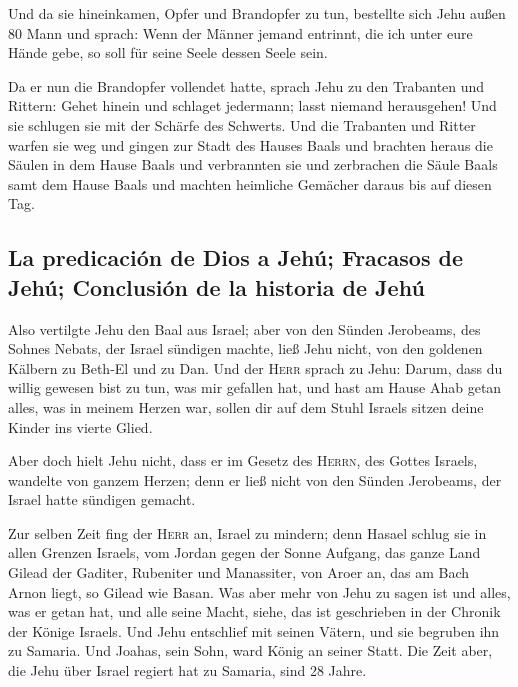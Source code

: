  Und da sie hineinkamen, Opfer und Brandopfer zu tun,
bestellte sich Jehu außen 80 Mann und sprach: Wenn der Männer jemand
entrinnt, die ich unter eure Hände gebe, so soll für seine Seele dessen
Seele sein.

 Da er nun die Brandopfer vollendet hatte, sprach Jehu zu
den Trabanten und Rittern: Gehet hinein und schlaget jedermann; lasst
niemand herausgehen! Und sie schlugen sie mit der Schärfe des Schwerts.
Und die Trabanten und Ritter warfen sie weg und gingen zur Stadt des
Hauses Baals  und brachten heraus die Säulen in dem Hause
Baals und verbrannten sie  und zerbrachen die Säule Baals
samt dem Hause Baals und machten heimliche Gemächer daraus bis auf
diesen Tag.

\hypertarget{la-predicaciuxf3n-de-dios-a-jehuxfa-fracasos-de-jehuxfa-conclusiuxf3n-de-la-historia-de-jehuxfa}{%
\subsection{La predicación de Dios a Jehú; Fracasos de Jehú; Conclusión
de la historia de
Jehú}\label{la-predicaciuxf3n-de-dios-a-jehuxfa-fracasos-de-jehuxfa-conclusiuxf3n-de-la-historia-de-jehuxfa}}

 Also vertilgte Jehu den Baal aus Israel; 
aber von den Sünden Jerobeams, des Sohnes Nebats, der Israel sündigen
machte, ließ Jehu nicht, von den goldenen Kälbern zu Beth-El und zu Dan.
 Und der \textsc{Herr} sprach zu Jehu: Darum, dass du
willig gewesen bist zu tun, was mir gefallen hat, und hast am Hause Ahab
getan alles, was in meinem Herzen war, sollen dir auf dem Stuhl Israels
sitzen deine Kinder ins vierte Glied.

 Aber doch hielt Jehu nicht, dass er im Gesetz des
\textsc{Herrn}, des Gottes Israels, wandelte von ganzem Herzen; denn er
ließ nicht von den Sünden Jerobeams, der Israel hatte sündigen gemacht.

 Zur selben Zeit fing der \textsc{Herr} an, Israel zu
mindern; denn Hasael schlug sie in allen Grenzen Israels,
 vom Jordan gegen der Sonne Aufgang, das ganze Land
Gilead der Gaditer, Rubeniter und Manassiter, von Aroer an, das am Bach
Arnon liegt, so Gilead wie Basan.  Was aber mehr von Jehu
zu sagen ist und alles, was er getan hat, und alle seine Macht, siehe,
das ist geschrieben in der Chronik der Könige Israels. 
Und Jehu entschlief mit seinen Vätern, und sie begruben ihn zu Samaria.
Und Joahas, sein Sohn, ward König an seiner Statt.  Die
Zeit aber, die Jehu über Israel regiert hat zu Samaria, sind 28 Jahre.

